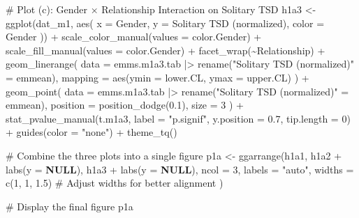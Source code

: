 \documentclass[
  bookmarksnumbered]{article}
\newenvironment{Shaded}{\begin{snugshade}}{\end{snugshade}}
\newcommand{\AttributeTok}[1]{\textcolor[rgb]{0.80,0.80,0.80}{#1}}
\newcommand{\CommentTok}[1]{\textcolor[rgb]{0.50,0.62,0.50}{#1}}
\newcommand{\ConstantTok}[1]{\textcolor[rgb]{0.86,0.64,0.64}{\textbf{#1}}}
\newcommand{\DecValTok}[1]{\textcolor[rgb]{0.86,0.86,0.80}{#1}}
\newcommand{\FloatTok}[1]{\textcolor[rgb]{0.75,0.75,0.82}{#1}}
\newcommand{\FunctionTok}[1]{\textcolor[rgb]{0.94,0.94,0.56}{#1}}
\newcommand{\NormalTok}[1]{\textcolor[rgb]{0.80,0.80,0.80}{#1}}
\newcommand{\OtherTok}[1]{\textcolor[rgb]{0.94,0.94,0.56}{#1}}
\newcommand{\SpecialCharTok}[1]{\textcolor[rgb]{0.86,0.64,0.64}{#1}}
\newcommand{\StringTok}[1]{\textcolor[rgb]{0.80,0.58,0.58}{#1}}
\begin{document}
\begin{Shaded}
\begin{Highlighting}[]
\CommentTok{\# Plot (c): Gender × Relationship Interaction on Solitary TSD}
\NormalTok{h1a3 }\OtherTok{\textless{}{-}} \FunctionTok{ggplot}\NormalTok{(dat\_m1, }\FunctionTok{aes}\NormalTok{(}
  \AttributeTok{x =}\NormalTok{ Gender, }\AttributeTok{y =} \StringTok{\textasciigrave{}}\AttributeTok{Solitary TSD (normalized)}\StringTok{\textasciigrave{}}\NormalTok{, }\AttributeTok{color =}\NormalTok{ Gender}
\NormalTok{)) }\SpecialCharTok{+}
  \FunctionTok{scale\_color\_manual}\NormalTok{(}\AttributeTok{values =}\NormalTok{ color.Gender) }\SpecialCharTok{+}
  \FunctionTok{scale\_fill\_manual}\NormalTok{(}\AttributeTok{values =}\NormalTok{ color.Gender) }\SpecialCharTok{+}
  \FunctionTok{facet\_wrap}\NormalTok{(}\SpecialCharTok{\textasciitilde{}}\NormalTok{Relationship) }\SpecialCharTok{+}
  \FunctionTok{geom\_linerange}\NormalTok{(}
    \AttributeTok{data =}\NormalTok{ emms.m1a3.tab }\SpecialCharTok{|\textgreater{}} \FunctionTok{rename}\NormalTok{(}\StringTok{"Solitary TSD (normalized)"} \OtherTok{=}\NormalTok{ emmean),}
    \AttributeTok{mapping =} \FunctionTok{aes}\NormalTok{(}\AttributeTok{ymin =}\NormalTok{ lower.CL, }\AttributeTok{ymax =}\NormalTok{ upper.CL)}
\NormalTok{  ) }\SpecialCharTok{+}
  \FunctionTok{geom\_point}\NormalTok{(}
    \AttributeTok{data =}\NormalTok{ emms.m1a3.tab }\SpecialCharTok{|\textgreater{}} \FunctionTok{rename}\NormalTok{(}\StringTok{"Solitary TSD (normalized)"} \OtherTok{=}\NormalTok{ emmean),}
    \AttributeTok{position =} \FunctionTok{position\_dodge}\NormalTok{(}\FloatTok{0.1}\NormalTok{), }\AttributeTok{size =} \DecValTok{3}
\NormalTok{  ) }\SpecialCharTok{+}
  \FunctionTok{stat\_pvalue\_manual}\NormalTok{(t.m1a3, }\AttributeTok{label =} \StringTok{"p.signif"}\NormalTok{, }\AttributeTok{y.position =} \FloatTok{0.7}\NormalTok{, }\AttributeTok{tip.length =} \DecValTok{0}\NormalTok{) }\SpecialCharTok{+}
  \FunctionTok{guides}\NormalTok{(}\AttributeTok{color =} \StringTok{"none"}\NormalTok{) }\SpecialCharTok{+}
  \FunctionTok{theme\_tq}\NormalTok{()}

\CommentTok{\# Combine the three plots into a single figure}
\NormalTok{p1a }\OtherTok{\textless{}{-}} \FunctionTok{ggarrange}\NormalTok{(h1a1, h1a2 }\SpecialCharTok{+} \FunctionTok{labs}\NormalTok{(}\AttributeTok{y =} \ConstantTok{NULL}\NormalTok{), h1a3 }\SpecialCharTok{+} \FunctionTok{labs}\NormalTok{(}\AttributeTok{y =} \ConstantTok{NULL}\NormalTok{),}
  \AttributeTok{ncol =} \DecValTok{3}\NormalTok{, }\AttributeTok{labels =} \StringTok{"auto"}\NormalTok{, }\AttributeTok{widths =} \FunctionTok{c}\NormalTok{(}\DecValTok{1}\NormalTok{, }\DecValTok{1}\NormalTok{, }\FloatTok{1.5}\NormalTok{) }\CommentTok{\# Adjust widths for better alignment}
\NormalTok{)}

\CommentTok{\# Display the final figure}
\NormalTok{p1a}
\end{Highlighting}
\end{Shaded}
\end{document}
